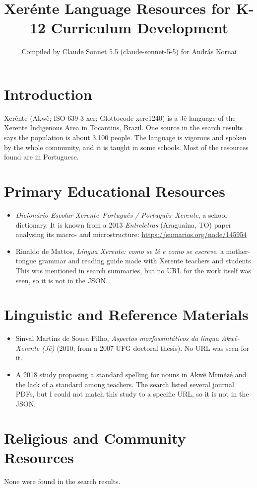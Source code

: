 \documentclass[12pt]{article}
\title{Xer\'ente Language Resources for K-12 Curriculum Development}
\author{Compiled by Claude Sonnet 5.5 (claude-sonnet-5-5) for Andr\'as Kornai}
\date{}
\begin{document}
\maketitle

\section{Introduction}
Xer\'ente (Akw\~e; ISO 639-3 xer; Glottocode xere1240) is a J\^e language of the Xerente Indigenous Area in Tocantins, Brazil. One source in the search results says the population is about 3,100 people. The language is vigorous and spoken by the whole community, and it is taught in some schools. Most of the resources found are in Portuguese.

\section{Primary Educational Resources}
\begin{itemize}
\item \emph{Dicion\'ario Escolar Xerente--Portugu\^es / Portugu\^es--Xerente}, a school dictionary. It is known from a 2013 \emph{Entreletras} (Aragua\'ina, TO) paper analysing its macro- and microstructure: \url{https://sumarios.org/node/145954}
\item Rinaldo de Mattos, \emph{L\'ingua Xerente: como se l\^e e como se escreve}, a mother-tongue grammar and reading guide made with Xerente teachers and students. This was mentioned in search summaries, but no URL for the work itself was seen, so it is not in the JSON.
\end{itemize}

\section{Linguistic and Reference Materials}
\begin{itemize}
\item Sinval Martins de Sousa Filho, \emph{Aspectos morfossint\'aticos da l\'ingua Akw\~e-Xerente (J\^e)} (2010, from a 2007 UFG doctoral thesis). No URL was seen for it.
\item A 2018 study proposing a standard spelling for nouns in Akw\~e Mrm\~ez\'e and the lack of a standard among teachers. The search listed several journal PDFs, but I could not match this study to a specific URL, so it is not in the JSON.
\end{itemize}

\section{Religious and Community Resources}
None were found in the search results.
\end{document}
